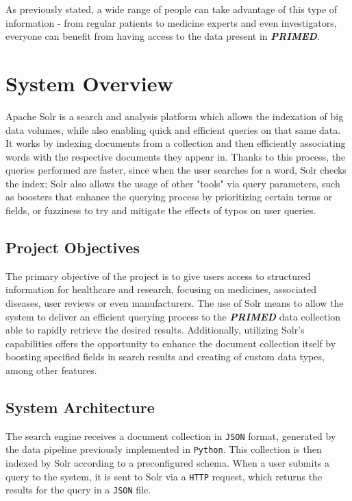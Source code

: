 \documentclass[sigconf]{acmart}
\begin{document}
As previously stated, a wide range of people can take advantage of this type of information - from regular patients to medicine experts and even investigators, everyone can benefit from having access to the data present in \textit{\textbf{PRIMED}}.

\section{System Overview}

Apache Solr\cite{solr} is a search and analysis platform which allows the indexation of big data volumes, while also enabling quick and efficient queries on that same data. It works by indexing documents from a collection and then efficiently associating words with the respective documents they appear in. Thanks to this process, the queries performed are faster, since when the user searches for a word, Solr checks the index; Solr also allows the usage of other "tools" via query parameters, such as boosters that enhance the querying process by prioritizing certain terms or fields, or fuzziness to try and mitigate the effects of typos on user queries.

\subsection{Project Objectives}

The primary objective of the project is to give users access to structured information for healthcare and research, focusing on medicines, associated diseases, user reviews or even manufacturers.
The use of Solr means to allow the system to deliver an efficient querying process to the \textit{\textbf{PRIMED}} data collection able to rapidly retrieve the desired results.
Additionally, utilizing Solr's capabilities offers the opportunity to enhance the document collection itself by boosting specified fields in search results and creating of custom data types, among other features.

\subsection{System Architecture}

The search engine receives a document collection in \texttt{JSON} format, generated by the data pipeline previously implemented in \texttt{Python}. This collection is then indexed by Solr according to a preconfigured schema\cite{schema}. When a user submits a query to the system, it is sent to Solr via a \texttt{HTTP} request\cite{http}, which returns the results for the query in a \texttt{JSON} file.
\end{document}
